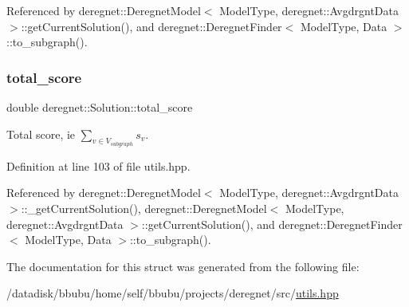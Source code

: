 Referenced by deregnet\+::\+Deregnet\+Model$<$ Model\+Type, deregnet\+::\+Avgdrgnt\+Data $>$\+::get\+Current\+Solution(), and deregnet\+::\+Deregnet\+Finder$<$ Model\+Type, Data $>$\+::to\+\_\+subgraph().

\mbox{\label{structderegnet_1_1Solution_af2e4901767f70d22b41acafa8cfb62d2}} 
\subsubsection{\texorpdfstring{total\+\_\+score}{total\_score}}
{\footnotesize\ttfamily double deregnet\+::\+Solution\+::total\+\_\+score}



Total score, ie $\displaystyle \sum_{v \in V_{subgraph}} s_v $. 



Definition at line 103 of file utils.\+hpp.



Referenced by deregnet\+::\+Deregnet\+Model$<$ Model\+Type, deregnet\+::\+Avgdrgnt\+Data $>$\+::\+\_\+get\+Current\+Solution(), deregnet\+::\+Deregnet\+Model$<$ Model\+Type, deregnet\+::\+Avgdrgnt\+Data $>$\+::get\+Current\+Solution(), and deregnet\+::\+Deregnet\+Finder$<$ Model\+Type, Data $>$\+::to\+\_\+subgraph().



The documentation for this struct was generated from the following file\+:\begin{DoxyCompactItemize}
\item 
/datadisk/bbubu/home/self/bbubu/projects/deregnet/src/\hyperlink{utils_8hpp}{utils.\+hpp}\end{DoxyCompactItemize}
